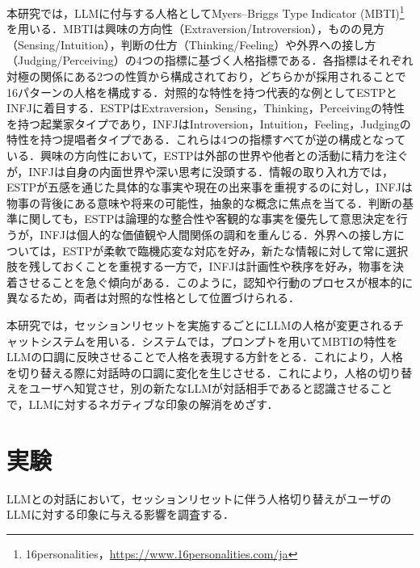 \documentclass[10pt,twocolumn]{jsarticle}
\begin{document}
本研究では，LLMに付与する人格としてMyers–Briggs Type Indicator (MBTI)\footnote{16personalities，\url{https://www.16personalities.com/ja}}を用いる．MBTIは興味の方向性（Extraversion/Introversion），ものの見方（Sensing/Intuition），判断の仕方（Thinking/Feeling）や外界への接し方（Judging/Perceiving）の4つの指標に基づく人格指標である．各指標はそれぞれ対極の関係にある2つの性質から構成されており\cite{Radisavljević2022}，どちらかが採用されることで16パターンの人格を構成する．対照的な特性を持つ代表的な例としてESTPとINFJに着目する．ESTPはExtraversion，Sensing，Thinking，Perceivingの特性を持つ起業家タイプであり，INFJはIntroversion，Intuition，Feeling，Judgingの特性を持つ提唱者タイプである．これらは4つの指標すべてが逆の構成となっている．興味の方向性において，ESTPは外部の世界や他者との活動に精力を注ぐが，INFJは自身の内面世界や深い思考に没頭する．情報の取り入れ方では，ESTPが五感を通じた具体的な事実や現在の出来事を重視するのに対し，INFJは物事の背後にある意味や将来の可能性，抽象的な概念に焦点を当てる．判断の基準に関しても，ESTPは論理的な整合性や客観的な事実を優先して意思決定を行うが，INFJは個人的な価値観や人間関係の調和を重んじる．外界への接し方については，ESTPが柔軟で臨機応変な対応を好み，新たな情報に対して常に選択肢を残しておくことを重視する一方で，INFJは計画性や秩序を好み，物事を決着させることを急ぐ傾向がある．このように，認知や行動のプロセスが根本的に異なるため，両者は対照的な性格として位置づけられる．

本研究では，セッションリセットを実施するごとにLLMの人格が変更されるチャットシステムを用いる．システムでは，プロンプトを用いてMBTIの特性をLLMの口調に反映させることで人格を表現する方針をとる．これにより，人格を切り替える際に対話時の口調に変化を生じさせる．これにより，人格の切り替えをユーザへ知覚させ，別の新たなLLMが対話相手であると認識させることで，LLMに対するネガティブな印象の解消をめざす．


\section{実験}
LLMとの対話において，セッションリセットに伴う人格切り替えがユーザのLLMに対する印象に与える影響を調査する．
\end{document}
